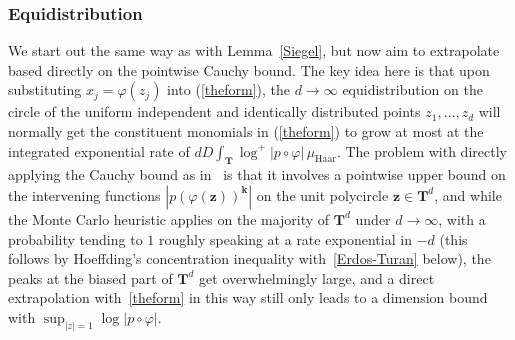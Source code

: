 \documentclass[10pt]{amsart}
\def\SSSS{\S}
\renewcommand\setminus{\smallsetminus}
\def\T{\mathbf{T}}
\def\Z{\mathbf{Z}}
\theoremstyle{remark}
\numberwithin{equation}{subsection}
\def\numequation{\addtocounter{subsubsection}{1}\begin{equation}}
\begin{document}
\subsubsection{Equidistribution} \label{equidistribution} We start out the same way as with Lemma~\ref{Siegel}, but now aim to extrapolate based directly on the pointwise Cauchy bound.  The key idea here is that upon substituting $x_j = \varphi(z_j)$ into (\ref{theform}), the $d \to \infty$ equidistribution on the circle of the 
uniform independent and identically distributed points $z_1, \ldots, z_d$ will normally get the constituent monomials in (\ref{theform})  to grow at most at the integrated exponential rate of $dD \int_{\T} \log^+{|p \circ \varphi| }\, \mu_{\mathrm{Haar}}$. %
The problem with directly applying the Cauchy bound as in~\cite[VIII~1.6]{AndreG} is that it involves a pointwise upper bound on the intervening functions $| p(\varphi(\mathbf{z}))^{\mathbf{k}}|$ on the unit polycircle $\mathbf{z} \in \T^d$, and while the Monte Carlo heuristic applies on the majority of $\T^d$ under $d \to \infty$, with a probability tending to $1$ roughly speaking at a rate exponential in $-d$ (this follows by Hoeffding's concentration inequality with~\eqref{Erdos-Turan} below), the peaks at the biased part of $\T^d$ get overwhelmingly large, and a direct extrapolation with~\eqref{theform} in this way  still only leads to a dimension bound with $\sup_{|z| = 1} \log{|p \circ \varphi|} $. 
\end{document}
